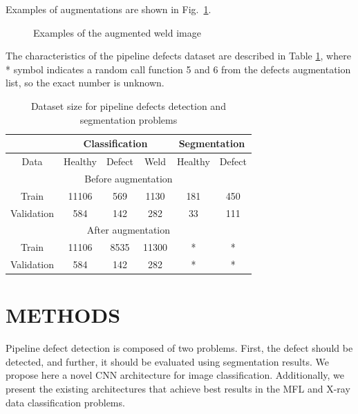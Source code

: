 Examples of augmentations are shown in Fig.~\ref{ris:aug_example}.
\begin{figure}[ht]
	\caption{Examples of the augmented weld image}
	\label{ris:aug_example}
\end{figure}


The characteristics of the pipeline defects dataset are described in Table \ref{tab:alg1}, where * symbol indicates a random call function 5 and 6 from the defects augmentation list, so the exact number is unknown.
\begin{table}[!htb]
	\caption{\label{tab:alg1}Dataset size for pipeline defects detection and segmentation problems}
	\begin{center}
		\small
		\begin{tabular}{ c | c  c  c | c  c }
			\multicolumn{1}{c}{} & \multicolumn{3}{c}{Classification} & \multicolumn{2}{c}{Segmentation} \\
			\hline
			Data & Healthy & Defect & Weld & Healthy & Defect \\
			\hline
			\multicolumn{6}{c}{Before augmentation}  \\
			\hline
			Train  & 11106 & 569 & 1130 & 181 & 450 \\
			Validation & 584 & 142 & 282 & 33 & 111 \\
			\hline
			\multicolumn{6}{c}{After augmentation}  \\
			\hline
			Train  & 11106 & 8535 & 11300 & * & * \\
			Validation & 584 & 142 & 282 & * & * \\
			\hline
		\end{tabular}
	\end{center}
\end{table}

\section{METHODS}
\label{METHODS}
Pipeline defect detection is composed of two problems. First, the defect should be detected, and further, it should be evaluated using segmentation results.
We propose here a novel CNN architecture for image classification.
Additionally, we present the existing architectures that achieve best results in the MFL and X-ray data classification problems.

